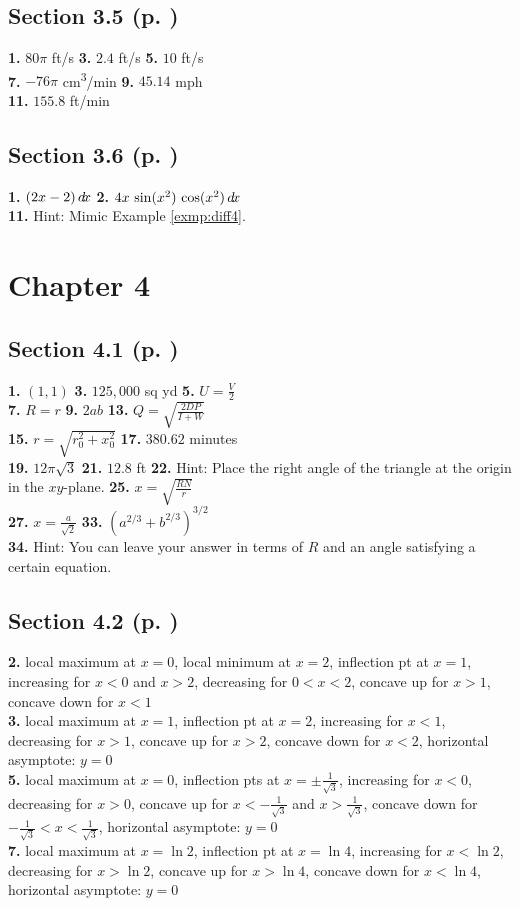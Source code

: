 \begin{multicols*}{2}
\subsection*{Section 3.5 (p. \pageref{sec3dot5})}
\textbf{1.} $80\pi$ ft/s \quad
\textbf{3.} $2.4$ ft/s \quad
\textbf{5.} $10$ ft/s\\
\textbf{7.} $-76\pi$ cm\textsuperscript{3}/min \quad
\textbf{9.} $45.14$ mph\\
\textbf{11.} $155.8$ ft/min
\subsection*{Section 3.6 (p. \pageref{sec3dot6})}
\textbf{1.} $(2x-2)\,d\!x$ \quad
\textbf{2.} $4x\,\sin (x^2)\,\cos (x^2)\,d\!x$\\
\textbf{11.} Hint: Mimic Example \ref{exmp:diff4}.
\section*{Chapter 4}
\subsection*{Section 4.1 (p. \pageref{sec4dot1})}
\textbf{1.} $(1,1)$ \quad
\textbf{3.} $125,000$ sq yd \quad
\textbf{5.} $U = \frac{V}{2}$\\
\textbf{7.} $R=r$ \quad
\textbf{9.} $2ab$ \quad
\textbf{13.} $Q=\sqrt{\frac{2DP}{I+W}}$\\
\textbf{15.} $r=\sqrt{r_0^2 + x_0^2}$ \quad
\textbf{17.} $380.62$ minutes\\
\textbf{19.} $12\pi \sqrt{3}$ \quad
\textbf{21.} $12.8$ ft \quad
\textbf{22.} Hint: Place the right angle of the triangle at the origin in the $xy$-plane. \quad
\textbf{25.} $x = \sqrt{\frac{RN}{r}}$\\
\textbf{27.} $x=\frac{a}{\sqrt{2}}$ \quad
\textbf{33.} $(a^{2/3} + b^{2/3})^{3/2}$\\
\textbf{34.} Hint: You can leave your answer in terms of $R$ and an angle satisfying
a certain equation.
\subsection*{Section 4.2 (p. \pageref{sec4dot2})}
\textbf{2.} local maximum at $x=0$, local minimum at $x=2$, inflection pt at $x=1$,
increasing for $x<0$ and $x>2$, decreasing for $0<x<2$, concave up for $x>1$,
concave down for $x<1$\\
\textbf{3.} local maximum at $x=1$, inflection pt at $x=2$, increasing for $x<1$,
decreasing for $x>1$, concave up for $x>2$, concave down for $x<2$, horizontal
asymptote: $y=0$\\
\textbf{5.} local maximum at $x=0$, inflection pts at $x=\pm \frac{1}{\sqrt{3}}$,
increasing for $x<0$, decreasing for $x>0$, concave up for $x<-\frac{1}{\sqrt{3}}$ and
$x>\frac{1}{\sqrt{3}}$, concave down for $-\frac{1}{\sqrt{3}}<x<\frac{1}{\sqrt{3}}$,
horizontal asymptote: $y=0$\\
\textbf{7.}  local maximum at $x=\ln 2$, inflection pt at $x=\ln 4$,
increasing for $x<\ln 2$, decreasing for $x>\ln 2$, concave up for $x>\ln 4$,
concave down for $x<\ln 4$, horizontal asymptote: $y=0$

\end{multicols*}

